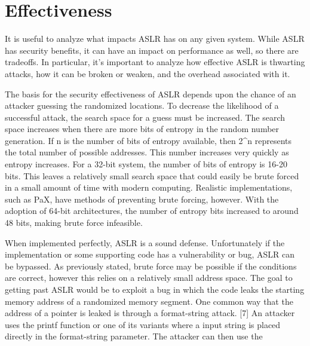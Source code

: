 \section{Effectiveness}
\label{s:effectiveness} %

It is useful to analyze what impacts ASLR has on any given system. While ASLR has security benefits, it can have an impact on performance as well, so there are tradeoffs. In particular, it’s important to analyze how effective ASLR is thwarting attacks, how it can be broken or weaken, and the overhead associated with it.

The basis for the security effectiveness of ASLR depends upon the chance of an attacker guessing the randomized locations. To decrease the likelihood of a successful attack, the search space for a guess must be increased. The search space increases when there are more bits of entropy in the random number generation. If n is the number of bits of entropy available, then 2^n represents the total number of possible addresses. This number increases very quickly as entropy increases. For a 32-bit system, the number of bits of entropy is 16-20 bits. This leaves a relatively small search space that could easily be brute forced in a small amount of time with modern computing. Realistic implementations, such as PaX, have methods of preventing brute forcing, however. With the adoption of 64-bit architectures, the number of entropy bits increased to around 48 bits, making brute force infeasible.

When implemented perfectly, ASLR is a sound defense. Unfortunately if the implementation or some supporting code has a vulnerability or bug, ASLR can be bypassed. As previously stated, brute force may be possible if the conditions are correct, however this relies on a relatively small address space. The goal to getting past ASLR would be to exploit a bug in which the code leaks the starting memory address of a randomized memory segment. One common way that the address of a pointer is leaked is through a format-string attack. [7] An attacker uses the printf function or one of its variants where a input string is placed directly in the format-string parameter. The attacker can then use the %

